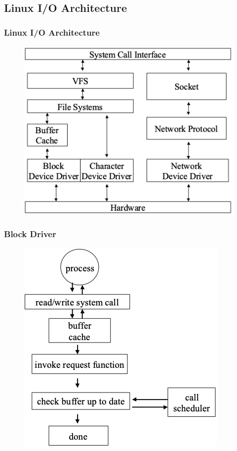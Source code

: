\subsection{Linux I/O Architecture} %
\begin{frame}[fragile]
    \frametitle{Linux I/O Architecture}
    \begin{figure}
    \includegraphics[width=0.8\linewidth]{figs/io-architecture.png}
    \end{figure}
\end{frame}
% 
% 
% 
\begin{frame}[fragile]
    \frametitle{Block Driver}
    \begin{figure}
    \includegraphics[width=0.8\linewidth]{figs/block-driver.png}
    \end{figure}
\end{frame}

